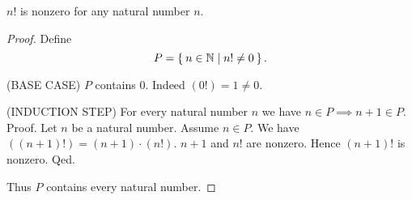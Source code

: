 \documentclass[../../arithmetic.ftl.tex]{subfiles}
\begin{document}
  \begin{forthel}
    \begin{proposition}\label{Arithmetic_01_05_473272}
      $n!$ is nonzero for any natural number $n$.
    \end{proposition}
    \begin{proof}
      Define \[ P = \Set{n \in \mathbb{N} | n! \neq 0}. \]

      (BASE CASE) $P$ contains $0$.
      Indeed $(0!) = 1 \neq 0$.

      (INDUCTION STEP) For every natural number $n$ we have $n \in P \implies n + 1 \in P$. \\
      Proof.
        Let $n$ be a natural number.
        Assume $n \in P$.
        We have $((n + 1)!) = (n + 1) \cdot (n!)$.
        $n + 1$ and $n!$ are nonzero.
        Hence $(n + 1)!$ is nonzero.
      Qed.

      Thus $P$ contains every natural number.
    \end{proof}
  \end{forthel}
\end{document}
